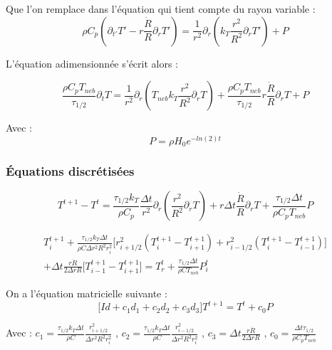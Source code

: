 \documentclass[10pt,a4paper]{article}
\numberwithin{equation}{section}
\begin{document}
Que l'on remplace dans l'équation qui tient compte du rayon variable :
\begin{equation}
\rho C_p (\partial_{t'} T' - r \frac{\dot{R}}{R}\partial_{r} T')= \frac{1}{r^2} \partial_{r} ( k_{T} \frac{r^2}{R^2} \partial_{r} T')  + P
\end{equation}

L'équation adimensionnée s'écrit alors :

\begin{equation}
\frac{\rho C_p T_{neb}}{\tau_{1/2}} \partial_{t} T =  \frac{1}{r^2} \partial_{r} ( T_{neb} k_{T} \frac{r^2}{R^2} \partial_{r} T) + \frac{\rho C_p T_{neb}}{\tau_{1/2}} r \frac{\dot{R}}{R}\partial_{r} T + P
\end{equation}

Avec :
\begin{equation}
 P = \rho H_0 e^{-ln(2) t} 
\end{equation}


\subsubsection{Équations discrétisées}






\begin{equation}
T^{t+1} - T^t =  \frac{\tau_{1/2}    k_{T}}{\rho C_p } \frac{\Delta t}{r^2} \partial_{r} ( \frac{r^2}{R^2} \partial_{r} T)  +r \Delta t \frac{\dot{R}}{R}\partial_{r} T + \frac{\tau_{1/2}    \Delta t}{\rho C_p T_{neb} } P
\end{equation}


\begin{multline}
T^{t+1}_i + \frac{\tau_{1/2} k_T \Delta t}{\rho C \Delta r^2 R^2 r^2_i}\Big [ r^2_{i+1/2}(T^{t+1}_{i} - T^{t+1}_{i+1}) + r^2_{i-1/2}(T^{t+1}_{i}- T^{t+1}_{i-1}) \Big] \\
+  \Delta t \frac{ r \dot{R}}{2\Delta r R}\Big [ T^{t+1}_{i-1} - T^{t+1}_{i+1}  \Big] = T^{t}_r  + \frac{\tau_{1/2} \Delta t}{\rho C T_{neb}} P^t_i
\end{multline}






On a l'équation matricielle suivante :
\begin{equation}
\Big [ Id + 
c_1  d_1 +  
c_2  d_2 +
c_3  d_3
 \Big] T^{t+1} = T^t + c_0 P  
\end{equation}

Avec  : 
$c_1 = \frac{\tau_{1/2} k_T \Delta t }{\rho C  }
\frac{r^2_{i+1/2}}{\Delta r^2 R^2 r^2_i}$
, $c_2 = \frac{\tau_{1/2} k_T \Delta t }{\rho C  }
\frac{r^2_{i-1/2}}{\Delta r^2 R^2 r^2_i}$
, $c_3 = \Delta t \frac{ r \dot{R}}{2\Delta r R}$
, $c_0 = \frac{\Delta t \tau_{1/2} }{\rho C_p T_{neb}}$ 
\end{document}
